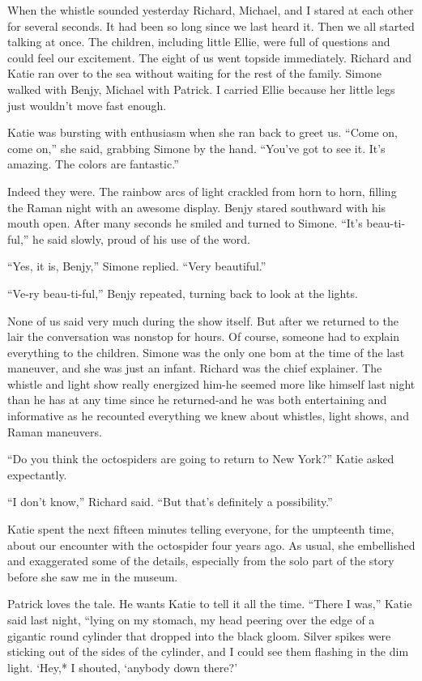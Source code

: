 \documentclass[]{article}
\begin{document}
{When the whistle sounded yesterday Richard, Michael, and I stared at each other for several seconds.  It had been so long since we last heard it.  Then we all started talking at once.  The children, including little Ellie, were full of questions and could feel our excitement.  The eight of us went topside immediately.  Richard and Katie ran over to the sea without waiting for the rest of the family.  Simone walked with Benjy, Michael with Patrick.  I carried Ellie because her little legs just wouldn’t move fast enough.

Katie was bursting with enthusiasm when she ran back to greet us.  “Come on, come on,” she said, grabbing Simone by the hand.  “You’ve got to see it.  It’s amazing.  The colors are fantastic.”

Indeed they were.  The rainbow arcs of light crackled from horn to horn, filling the Raman night with an awesome display.  Benjy stared southward with his mouth open.  After many seconds he smiled and turned to Simone.  “It’s beau-ti-ful,” he said slowly, proud of his use of the word.

“Yes, it is, Benjy,” Simone replied.  “Very beautiful.”

“Ve-ry beau-ti-ful,” Benjy repeated, turning back to look at the lights.

None of us said very much during the show itself.  But after we returned to the lair the conversation was nonstop for hours.  Of course, someone had to explain everything to the children.  Simone was the only one bom at the time of the last maneuver, and she was just an infant.  Richard was the chief explainer.  The whistle and light show really energized him-he seemed more like himself last night than he has at any time since he returned-and he was both entertaining and informative as he recounted everything we knew about whistles, light shows, and Raman maneuvers.

“Do you think the octospiders are going to return to New York?” Katie asked expectantly.

“I don’t know,” Richard said.  “But that’s definitely a possibility.”

Katie spent the next fifteen minutes telling everyone, for the umpteenth time, about our encounter with the octospider four years ago.  As usual, she embellished and exaggerated some of the details, especially from the solo part of the story before she saw me in the museum.

Patrick loves the tale.  He wants Katie to tell it all the time.  “There I was,” Katie said last night, “lying on my stomach, my head peering over the edge of a gigantic round cylinder that dropped into the black gloom.  Silver spikes were sticking out of the sides of the cylinder, and I could see them flashing in the dim light.  ‘Hey,* I shouted, ‘anybody down there?’

}
\end{document}
